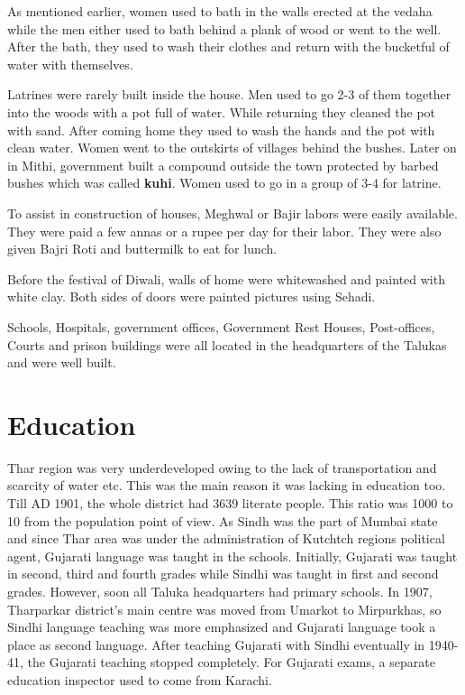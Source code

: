 As mentioned earlier, women used to bath in the walls erected at the vedaha
while the men either used to bath behind a plank of wood or went to the well.
After the bath, they used to wash their clothes and return with the
bucketful of water with themselves.

Latrines were rarely built inside the house. Men used to go 2-3 of them together
into the woods with a pot full of water. While returning they cleaned the pot
with sand. After coming home they used to wash the hands and the pot with clean
water. Women went to the outskirts of villages behind the bushes. Later on in
Mithi, government built a compound outside the town protected by barbed bushes
which was called \textbf{kuhi}. Women used to go in a group of 3-4 for latrine.

To assist in construction of houses, Meghwal or Bajir labors were easily
available. They were paid a few annas or a rupee per day for their labor. They
were also given Bajri Roti and buttermilk to eat for lunch.

Before the festival of Diwali, walls of home were whitewashed and painted with
white clay. Both sides of doors were painted pictures using Sehadi.

Schools, Hospitals, government offices, Government Rest Houses, Post-offices,
Courts and prison buildings were all located in the headquarters of the Talukas
and were well built.

\section{Education}
Thar region was very underdeveloped owing to the lack of transportation and
scarcity of water etc. This was the main reason it was lacking in education too.
Till AD 1901, the whole district had 3639 literate people. This ratio was 1000
to 10 from the population point of view.
As Sindh was the part of Mumbai state and since Thar area was under the
administration of Kutchtch regions political agent, Gujarati language was taught
in the schools. Initially, Gujarati was taught in second, third and fourth
grades while Sindhi was taught in first and second grades. However, soon all
Taluka headquarters had primary schools. In 1907, Tharparkar district's main
centre was moved from Umarkot to Mirpurkhas, so Sindhi language teaching was
more emphasized and Gujarati language took a place as second language. After
teaching Gujarati with Sindhi eventually in 1940-41, the Gujarati teaching
stopped completely. For Gujarati exams, a separate education inspector used to
come from Karachi.

